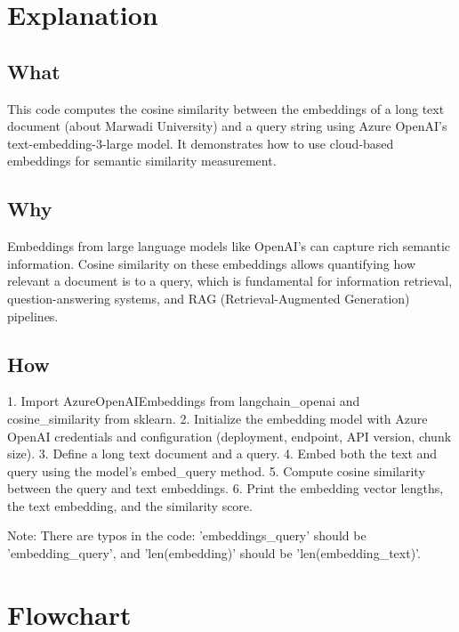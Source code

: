 \documentclass[11pt, a4paper]{article}
\begin{document}
\section{Explanation}

\subsection{What}
This code computes the cosine similarity between the embeddings of a long text document (about Marwadi University) and a query string using Azure OpenAI's text-embedding-3-large model. It demonstrates how to use cloud-based embeddings for semantic similarity measurement.

\subsection{Why}
Embeddings from large language models like OpenAI's can capture rich semantic information. Cosine similarity on these embeddings allows quantifying how relevant a document is to a query, which is fundamental for information retrieval, question-answering systems, and RAG (Retrieval-Augmented Generation) pipelines.

\subsection{How}
1. Import AzureOpenAIEmbeddings from langchain\_openai and cosine\_similarity from sklearn.
2. Initialize the embedding model with Azure OpenAI credentials and configuration (deployment, endpoint, API version, chunk size).
3. Define a long text document and a query.
4. Embed both the text and query using the model's embed\_query method.
5. Compute cosine similarity between the query and text embeddings.
6. Print the embedding vector lengths, the text embedding, and the similarity score.

Note: There are typos in the code: 'embeddings\_query' should be 'embedding\_query', and 'len(embedding)' should be 'len(embedding\_text)'.

\section{Flowchart}
\end{document}
